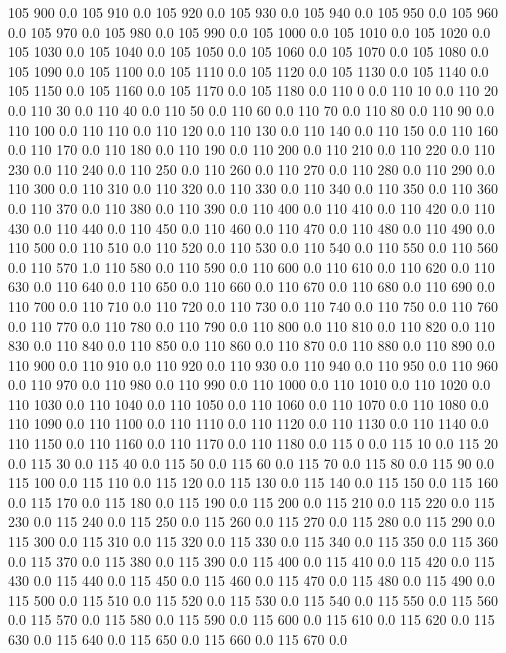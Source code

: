 105	900	0.0
105	910	0.0
105	920	0.0
105	930	0.0
105	940	0.0
105	950	0.0
105	960	0.0
105	970	0.0
105	980	0.0
105	990	0.0
105	1000	0.0
105	1010	0.0
105	1020	0.0
105	1030	0.0
105	1040	0.0
105	1050	0.0
105	1060	0.0
105	1070	0.0
105	1080	0.0
105	1090	0.0
105	1100	0.0
105	1110	0.0
105	1120	0.0
105	1130	0.0
105	1140	0.0
105	1150	0.0
105	1160	0.0
105	1170	0.0
105	1180	0.0
110	0	0.0
110	10	0.0
110	20	0.0
110	30	0.0
110	40	0.0
110	50	0.0
110	60	0.0
110	70	0.0
110	80	0.0
110	90	0.0
110	100	0.0
110	110	0.0
110	120	0.0
110	130	0.0
110	140	0.0
110	150	0.0
110	160	0.0
110	170	0.0
110	180	0.0
110	190	0.0
110	200	0.0
110	210	0.0
110	220	0.0
110	230	0.0
110	240	0.0
110	250	0.0
110	260	0.0
110	270	0.0
110	280	0.0
110	290	0.0
110	300	0.0
110	310	0.0
110	320	0.0
110	330	0.0
110	340	0.0
110	350	0.0
110	360	0.0
110	370	0.0
110	380	0.0
110	390	0.0
110	400	0.0
110	410	0.0
110	420	0.0
110	430	0.0
110	440	0.0
110	450	0.0
110	460	0.0
110	470	0.0
110	480	0.0
110	490	0.0
110	500	0.0
110	510	0.0
110	520	0.0
110	530	0.0
110	540	0.0
110	550	0.0
110	560	0.0
110	570	1.0
110	580	0.0
110	590	0.0
110	600	0.0
110	610	0.0
110	620	0.0
110	630	0.0
110	640	0.0
110	650	0.0
110	660	0.0
110	670	0.0
110	680	0.0
110	690	0.0
110	700	0.0
110	710	0.0
110	720	0.0
110	730	0.0
110	740	0.0
110	750	0.0
110	760	0.0
110	770	0.0
110	780	0.0
110	790	0.0
110	800	0.0
110	810	0.0
110	820	0.0
110	830	0.0
110	840	0.0
110	850	0.0
110	860	0.0
110	870	0.0
110	880	0.0
110	890	0.0
110	900	0.0
110	910	0.0
110	920	0.0
110	930	0.0
110	940	0.0
110	950	0.0
110	960	0.0
110	970	0.0
110	980	0.0
110	990	0.0
110	1000	0.0
110	1010	0.0
110	1020	0.0
110	1030	0.0
110	1040	0.0
110	1050	0.0
110	1060	0.0
110	1070	0.0
110	1080	0.0
110	1090	0.0
110	1100	0.0
110	1110	0.0
110	1120	0.0
110	1130	0.0
110	1140	0.0
110	1150	0.0
110	1160	0.0
110	1170	0.0
110	1180	0.0
115	0	0.0
115	10	0.0
115	20	0.0
115	30	0.0
115	40	0.0
115	50	0.0
115	60	0.0
115	70	0.0
115	80	0.0
115	90	0.0
115	100	0.0
115	110	0.0
115	120	0.0
115	130	0.0
115	140	0.0
115	150	0.0
115	160	0.0
115	170	0.0
115	180	0.0
115	190	0.0
115	200	0.0
115	210	0.0
115	220	0.0
115	230	0.0
115	240	0.0
115	250	0.0
115	260	0.0
115	270	0.0
115	280	0.0
115	290	0.0
115	300	0.0
115	310	0.0
115	320	0.0
115	330	0.0
115	340	0.0
115	350	0.0
115	360	0.0
115	370	0.0
115	380	0.0
115	390	0.0
115	400	0.0
115	410	0.0
115	420	0.0
115	430	0.0
115	440	0.0
115	450	0.0
115	460	0.0
115	470	0.0
115	480	0.0
115	490	0.0
115	500	0.0
115	510	0.0
115	520	0.0
115	530	0.0
115	540	0.0
115	550	0.0
115	560	0.0
115	570	0.0
115	580	0.0
115	590	0.0
115	600	0.0
115	610	0.0
115	620	0.0
115	630	0.0
115	640	0.0
115	650	0.0
115	660	0.0
115	670	0.0
